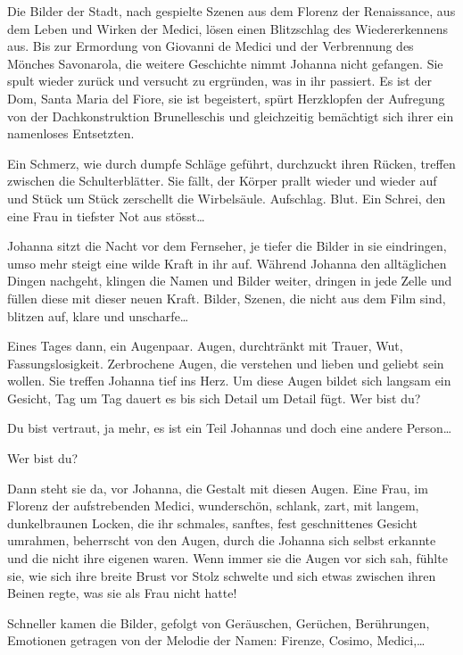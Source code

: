 \documentclass[10pt,titlepage,a5paper]{book}
\begin{document}
Die Bilder der Stadt, nach gespielte Szenen aus dem Florenz der Renaissance, aus dem Leben und Wirken der Medici, lösen einen Blitzschlag des Wiedererkennens aus. Bis zur Ermordung von Giovanni de Medici und der Verbrennung des Mönches Savonarola, die weitere Geschichte nimmt Johanna nicht gefangen. Sie spult wieder zurück und versucht zu ergründen, was in ihr passiert. Es ist der Dom, Santa Maria del Fiore, sie ist begeistert, spürt Herzklopfen der Aufregung von der Dachkonstruktion Brunelleschis und gleichzeitig bemächtigt sich ihrer ein namenloses Entsetzten.

 Ein Schmerz, wie durch dumpfe Schläge geführt, durchzuckt ihren Rücken, treffen zwischen die Schulterblätter. Sie fällt, der Körper prallt wieder und wieder auf und Stück um Stück zerschellt die Wirbelsäule. Aufschlag. Blut. Ein Schrei, den eine Frau in tiefster Not aus stösst\dots  
 
 Johanna sitzt die Nacht vor dem Fernseher, je tiefer die Bilder in sie eindringen, umso mehr steigt  eine wilde Kraft in ihr auf. Während Johanna den alltäglichen Dingen nachgeht, klingen die Namen und Bilder weiter, dringen in jede Zelle und füllen diese mit dieser neuen Kraft. Bilder, Szenen, die nicht aus dem Film sind, blitzen auf, klare und unscharfe\dots 

Eines Tages dann, ein Augenpaar. Augen, durchtränkt mit Trauer, Wut, Fassungslosigkeit. Zerbrochene Augen, die verstehen und lieben und geliebt sein wollen. Sie treffen Johanna tief ins Herz. Um diese Augen bildet sich langsam ein Gesicht, Tag um Tag dauert es bis sich Detail um Detail fügt.
Wer bist du?

Du bist vertraut, ja mehr, es ist ein Teil Johannas und doch eine andere Person\dots 

Wer bist du?

Dann steht sie da, vor Johanna, die Gestalt mit diesen Augen. 
Eine Frau, im Florenz der aufstrebenden Medici, wunderschön, schlank, zart, mit langem, dunkelbraunen Locken, die ihr schmales, sanftes, fest geschnittenes Gesicht umrahmen, beherrscht von den Augen, durch die Johanna sich selbst erkannte und die nicht ihre eigenen waren. Wenn immer sie die Augen vor sich sah, fühlte sie, wie sich ihre breite Brust vor Stolz schwelte und sich etwas zwischen ihren Beinen regte, was sie als Frau nicht hatte! 

Schneller kamen die Bilder, gefolgt von Geräuschen, Gerüchen, Be\-rühr\-ungen, Emotionen getragen von der Melodie der Namen: Firenze, Cosimo, Medici,\dots 
\end{document}
